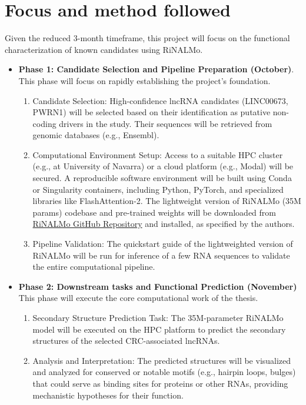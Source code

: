 \documentclass[ENG]{TFUOC}%
\begin{document}
\section{Focus and method followed}

Given the reduced 3-month timeframe, this project will focus on the functional characterization of known candidates using RiNALMo.  	

\begin{itemize}
    \item \textbf{Phase 1: Candidate Selection and Pipeline Preparation (October)}. This phase will focus on rapidly establishing the project's foundation.
    \begin{enumerate}
        \item Candidate Selection: High-confidence lncRNA candidates (LINC00673, PWRN1) will be selected based on their identification as putative non-coding drivers in the \cite{cornishGenomicLandscape20232024a} study. Their sequences will be retrieved from genomic databases (e.g., Ensembl).
        \item Computational Environment Setup: Access to a suitable HPC cluster (e.g., at University of Navarra) or a cloud platform (e.g., Modal) will be secured. A reproducible software environment will be built using Conda or Singularity containers, including Python, PyTorch, and specialized libraries like FlashAttention-2. The lightweight version of RiNALMo (35M params) codebase and pre-trained weights will be downloaded from \href{https://github.com/lbcb-sci/RiNALMo}{RiNALMo GitHub Repository} and installed, as specified by the authors.
        \item Pipeline Validation: The quickstart guide of the lightweighted version of RiNALMo will be run for inference of a few RNA sequences to validate the entire computational pipeline.
    \end{enumerate}
    \item \textbf{Phase 2: Downstream tasks and Functional Prediction (November)} This phase will execute the core computational work of the thesis.
    \begin{enumerate}
        \item Secondary Structure Prediction Task: The 35M-parameter RiNALMo model will be executed on the HPC platform to predict the secondary structures of the selected CRC-associated lncRNAs. 
        \item Analysis and Interpretation: The predicted structures will be visualized and analyzed for conserved or notable motifs (e.g., hairpin loops, bulges) that could serve as binding sites for proteins or other RNAs, providing mechanistic hypotheses for their function.

\end{enumerate}
\end{itemize}
\end{document}

